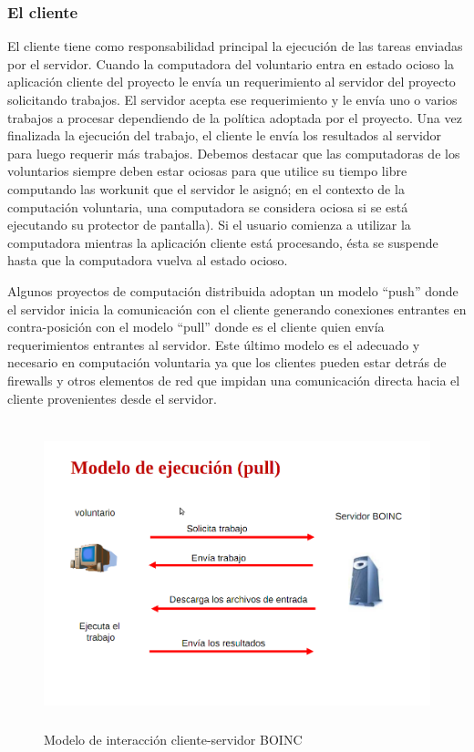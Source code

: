 \subsubsection{El cliente}

El cliente tiene como responsabilidad principal la ejecución de las tareas enviadas por el servidor. Cuando la computadora del voluntario entra en estado ocioso 
la aplicación cliente del proyecto le envía un requerimiento al servidor del proyecto solicitando trabajos.
 El servidor acepta ese requerimiento y le envía uno o varios trabajos a procesar dependiendo de la política adoptada por el proyecto. 
Una  vez finalizada la ejecución del  trabajo, el cliente le envía los resultados al servidor para luego requerir más trabajos.
Debemos destacar que las computadoras de los voluntarios siempre deben estar ociosas para que utilice su tiempo libre computando 
las workunit que el servidor le asignó; en el contexto de la computación voluntaria, una computadora se considera ociosa si se está ejecutando 
su protector de pantalla). Si el usuario comienza a utilizar la computadora mientras la aplicación cliente está procesando, 
ésta se suspende hasta que la computadora vuelva al estado ocioso.

Algunos proyectos de computación distribuida adoptan un modelo “push” donde el servidor inicia la comunicación con el cliente generando
 conexiones entrantes en contra-posición con el modelo “pull” donde es el cliente quien envía requerimientos entrantes al servidor.
Este último modelo es el adecuado y necesario en computación voluntaria ya que los clientes pueden estar detrás de firewalls y otros 
elementos de red que impidan una comunicación directa hacia el cliente provenientes desde el servidor.

\begin{figure}[H]
\begin{center}
  \includegraphics[height=3.5in,width=5.0in]{images/pull.png}
\caption{ Modelo de interacción cliente-servidor BOINC}
\label{fig:pull}
\end{center}
\end{figure} 

